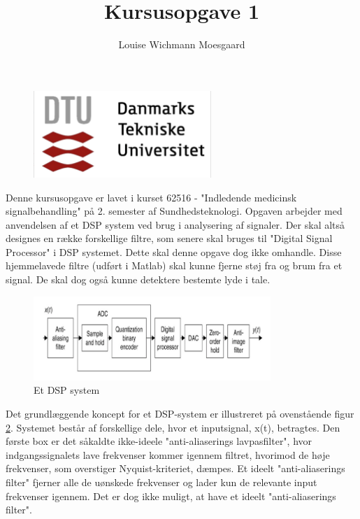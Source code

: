 \documentclass[a4paper]{report}
\title{Kursusopgave 1}
\author{Louise Wichmann Moesgaard}
\begin{document}
\maketitle
    
\begin{figure}[H] 
\centering
\includegraphics[width=0.6\textwidth]{grafer/DTU}
\label{DTU}
\end{figure}


\newpage

Denne kursusopgave er lavet i kurset 62516 - "Indledende medicinsk signalbehandling" på 2. semester af Sundhedsteknologi.  Opgaven arbejder med anvendelsen af et DSP system ved brug i analysering af signaler. Der skal altså designes en række forskellige filtre, som senere skal bruges til "Digital Signal Processor" i DSP systemet. Dette skal denne opgave dog ikke omhandle. 
Disse hjemmelavede filtre (udført i Matlab) skal kunne fjerne støj fra og brum fra et signal. De skal dog også kunne detektere bestemte lyde i tale. 


\begin{figure}[H] 
\centering
\includegraphics[width=0.8\textwidth]{grafer/Opgave1}
\caption{Et DSP system} \label{Opgave1}
\end{figure}

Det grundlæggende koncept for et DSP-system er illustreret på ovenstående figur \ref{Opgave1}. Systemet består af forskellige dele, hvor et inputsignal, x(t), betragtes. Den første box er det såkaldte ikke-ideele "anti-aliaserings lavpasfilter", hvor indgangssignalets lave frekvenser kommer igennem filtret, hvorimod de høje frekvenser, som overstiger Nyquist-kriteriet, dæmpes. Et ideelt "anti-aliaserings filter" fjerner alle de uønskede frekvenser og lader kun de relevante input frekvenser igennem. Det er dog ikke muligt, at have et ideelt "anti-aliaserings filter". 
\end{document}

